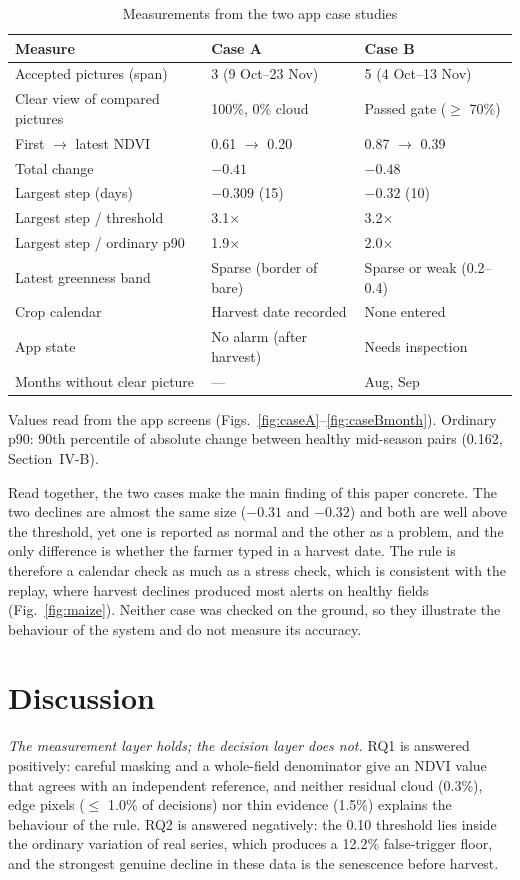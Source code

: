 \documentclass[conference]{IEEEtran}
\begin{document}
\begin{table}[t]
\caption{Measurements from the two app case studies}
\label{tab:cases}
\centering
\footnotesize
\begin{tabular}{@{}p{2.45cm}p{2.5cm}p{2.5cm}@{}}
\toprule
Measure & Case A & Case B \\
\midrule
Accepted pictures (span) & 3 (9 Oct--23 Nov) & 5 (4 Oct--13 Nov) \\
Clear view of compared pictures & 100\%, 0\% cloud & Passed gate ($\geq$ 70\%) \\
First $\to$ latest NDVI & 0.61 $\to$ 0.20 & 0.87 $\to$ 0.39 \\
Total change & $-0.41$ & $-0.48$ \\
Largest step (days) & $-0.309$ (15) & $-0.32$ (10) \\
Largest step / threshold & 3.1$\times$ & 3.2$\times$ \\
Largest step / ordinary p90 & 1.9$\times$ & 2.0$\times$ \\
Latest greenness band & Sparse (border of bare) & Sparse or weak (0.2--0.4) \\
Crop calendar & Harvest date recorded & None entered \\
App state & No alarm (after harvest) & Needs inspection \\
Months without clear picture & --- & Aug, Sep \\
\bottomrule
\end{tabular}

\vspace{2pt}
{\scriptsize Values read from the app screens (Figs.~\ref{fig:caseA}--\ref{fig:caseBmonth}). Ordinary p90: 90th percentile of absolute change between healthy mid-season pairs (0.162, Section~IV-B).}
\end{table}

Read together, the two cases make the main finding of this paper concrete. The two declines are almost the same size ($-0.31$ and $-0.32$) and both are well above the threshold, yet one is reported as normal and the other as a problem, and the only difference is whether the farmer typed in a harvest date. The rule is therefore a calendar check as much as a stress check, which is consistent with the replay, where harvest declines produced most alerts on healthy fields (Fig.~\ref{fig:maize}). Neither case was checked on the ground, so they illustrate the behaviour of the system and do not measure its accuracy.

\section{Discussion}
\textit{The measurement layer holds; the decision layer does not.} RQ1 is answered positively: careful masking and a whole-field denominator give an NDVI value that agrees with an independent reference, and neither residual cloud (0.3\%), edge pixels ($\leq$ 1.0\% of decisions) nor thin evidence (1.5\%) explains the behaviour of the rule. RQ2 is answered negatively: the 0.10 threshold lies inside the ordinary variation of real series, which produces a 12.2\% false-trigger floor, and the strongest genuine decline in these data is the senescence before harvest.
\end{document}
